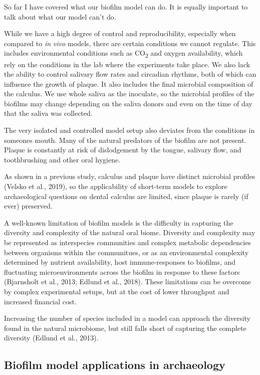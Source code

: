 \documentclass[
  letterpaper,
]{book}
\begin{document}
So far I have covered what our biofilm model can do. It is equally
important to talk about what our model can't do.

While we have a high degree of control and reproducibility, especially
when compared to \emph{in vivo} models, there are certain conditions we
cannot regulate. This includes environmental conditions such as
CO\textsubscript{2} and oxygen availability, which rely on the
conditions in the lab where the experiments take place. We also lack the
ability to control salivary flow rates and circadian rhythms, both of
which can influence the growth of plaque. It also includes the final
microbial composition of the calculus. We use whole saliva as the
inoculate, so the microbial profiles of the biofilms may change
depending on the saliva donors and even on the time of day that the
saliva was collected.

The very isolated and controlled model setup also deviates from the
conditions in someones mouth. Many of the natural predators of the
biofilm are not present. Plaque is constantly at risk of dislodgement by
the tongue, salivary flow, and toothbrushing and other oral hygiene.

As shown in a previous study, calculus and plaque have distinct
microbial profiles (Velsko et al., 2019), so the applicability of
short-term models to explore archaeological questions on dental calculus
are limited, since plaque is rarely (if ever) preserved.

A well-known limitation of biofilm models is the difficulty in capturing
the diversity and complexity of the natural oral biome. Diversity and
complexity may be represented as interspecies communities and complex
metabolic dependencies between organisms within the communitues, or as
an environmental complexity determined by nutrient availability, host
immune-responses to biofilms, and fluctuating microenvironments across
the biofilm in response to these factors (Bjarnsholt et al., 2013;
Edlund et al., 2018). These limitations can be overcome by complex
experimental setups, but at the cost of lower throughput and increased
financial cost.

Increasing the number of species included in a model can approach the
diversity found in the natural microbiome, but still falls short of
capturing the complete diversity (Edlund et al., 2013).

\hypertarget{biofilm-model-applications-in-archaeology}{%
\subsection{Biofilm model applications in
archaeology}\label{biofilm-model-applications-in-archaeology}}
\end{document}
